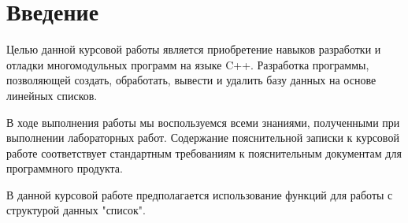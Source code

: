 \section*{Введение}

Целью данной курсовой работы является приобретение навыков разработки и отладки многомодульных
программ на языке C++. Разработка программы, позволяющей создать,
обработать, вывести и удалить базу данных на основе линейных списков.

В ходе выполнения работы мы воспользуемся всеми знаниями, полученными при выполнении лабораторных работ.
Содержание пояснительной записки к курсовой работе соответствует стандартным требованиям к пояснительным документам для программного продукта.

В данной курсовой работе предполагается использование функций для
работы с структурой данных "список".